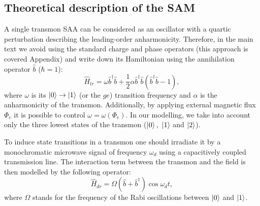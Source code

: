 \documentclass[%
 aip,
 amsmath,amssymb,
 reprint,%
]{revtex4-1}
\begin{document}
\subsection{Theoretical description of the SAM}

A single transmon SAA can be considered as an oscillator with a quartic perturbation describing the leading-order anharmonicity. Therefore, in the main text we avoid using the standard charge and phase operators (this approach is covered Appendix) and write down its Hamiltonian using the annihilation operator $\hat b$ ($\hbar = 1$):
\begin{equation}
\hat{{H}}_{tr} = \omega \hat b^{\dagger}\hat b +\frac{1}{2}\alpha \hat b^{\dagger}\hat b(\hat b^{\dagger}\hat b-1),
\end{equation}
where $\omega$ is its $\ket{0}\rightarrow\ket{1}$ (or the  $ge$) transition frequency and $\alpha$ is the anharmonicity of the transmon. Additionally, by applying external magnetic flux $\Phi_e$ it is possible to control $\omega = \omega(\Phi_e)$\cite{koch2007charge}. In our modelling, we take into account only the three lowest states of the transmon ($\ket{0},\ \ket{1}$ and $\ket{2}$).

To induce state transitions in a transmon one should irradiate it by a monochromatic microwave signal of frequency $\omega_d$ using a capacitively coupled transmission line. The interaction term between the transmon and the field is then modelled by the following operator: 
\begin{equation}
\hat H_{dr} = \Omega (\hat b+\hat b^{\dagger}) \cos\omega_d t,
\end{equation}
where $\Omega$ stands for the frequency of the Rabi oscillations between $\ket{0}$ and $\ket{1}$.
\end{document}
